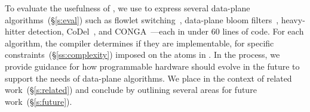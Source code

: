 To evaluate the usefulness of \pktlanguage, we use \pktlanguage to express
several data-plane algorithms~(\S\ref{s:eval}) such as flowlet
switching~\cite{flowlets}, data-plane bloom filters~\cite{bloom}, heavy-hitter
detection, CoDel~\cite{codel}, and CONGA~\cite{conga}---each in under 60 lines
of \pktlanguage code. For each algorithm, the \pktlanguage compiler determines
if they are implementable, for specific constraints~(\S\ref{ss:complexity})
imposed on the atoms in \absmachine. In the process, we provide guidance for
how programmable hardware should evolve in the future to support the needs of
data-plane algorithms.  We place \pktlanguage in the context of related
work~(\S\ref{s:related}) and conclude by outlining several areas for future
work~(\S\ref{s:future}).
